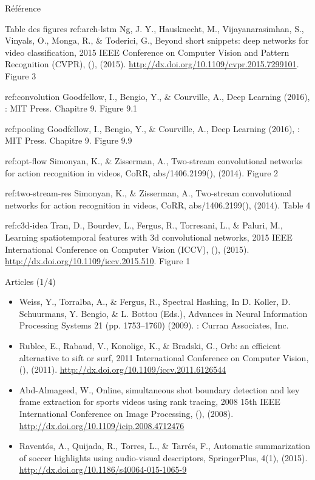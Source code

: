 \documentclass[presentation]{beamer}
\begin{document}
\begin{frame}[label={sec:orgf20d3a5}]{Référence}
\end{frame}
\begin{frame}[label={sec:org0d8a804}]{Table des figures}
ref:arch-lstm Ng, J. Y., Hausknecht, M., Vijayanarasimhan, S., Vinyals, O., Monga, R., \& Toderici, G., Beyond short snippets: deep networks for video classification, 2015 IEEE Conference on Computer Vision and Pattern Recognition (CVPR), (),  (2015).  \url{http://dx.doi.org/10.1109/cvpr.2015.7299101}. Figure 3

ref:convolution Goodfellow, I., Bengio, Y., \& Courville, A., Deep Learning (2016), : MIT Press. Chapitre 9. Figure 9.1

ref:pooling Goodfellow, I., Bengio, Y., \& Courville, A., Deep Learning (2016), : MIT Press. Chapitre 9. Figure 9.9

ref:opt-flow Simonyan, K., \& Zisserman, A., Two-stream convolutional networks for action recognition in videos, CoRR, abs/1406.2199(),  (2014). Figure 2

ref:two-stream-res Simonyan, K., \& Zisserman, A., Two-stream convolutional networks for action recognition in videos, CoRR, abs/1406.2199(),  (2014). Table 4

ref:c3d-idea Tran, D., Bourdev, L., Fergus, R., Torresani, L., \& Paluri, M., Learning spatiotemporal features with 3d convolutional networks, 2015 IEEE International Conference on Computer Vision (ICCV), (),  (2015).  \url{http://dx.doi.org/10.1109/iccv.2015.510}. Figure 1
\end{frame}

\begin{frame}[label={sec:org2865d5c}]{Articles (1/4)}
\begin{itemize}
\item Weiss, Y., Torralba, A., \& Fergus, R., Spectral Hashing, In D. Koller, D. Schuurmans, Y. Bengio, \& L. Bottou (Eds.), Advances in Neural Information Processing Systems 21 (pp. 1753–1760) (2009). : Curran Associates, Inc.
\item Rublee, E., Rabaud, V., Konolige, K., \& Bradski, G., Orb: an efficient alternative to sift or surf, 2011 International Conference on Computer Vision, (),  (2011).  \url{http://dx.doi.org/10.1109/iccv.2011.6126544}
\item Abd-Almageed, W., Online, simultaneous shot boundary detection and key frame extraction for sports videos using rank tracing, 2008 15th IEEE International Conference on Image Processing, (),  (2008).  \url{http://dx.doi.org/10.1109/icip.2008.4712476}
\item Raventós, A., Quijada, R., Torres, L., \& Tarrés, F., Automatic summarization of soccer highlights using audio-visual descriptors, SpringerPlus, 4(1),  (2015).  \url{http://dx.doi.org/10.1186/s40064-015-1065-9}
\end{itemize}
\end{frame}
\end{document}
